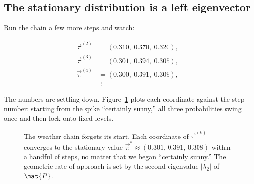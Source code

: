\subsection{The stationary distribution is a left eigenvector}

Run the chain a few more steps and watch:

\[
\begin{aligned}
\vec\pi^{(2)} &= (0.310,\ 0.370,\ 0.320),\\
\vec\pi^{(3)} &= (0.301,\ 0.394,\ 0.305),\\
\vec\pi^{(4)} &= (0.300,\ 0.391,\ 0.309),\\
&\ \,\vdots
\end{aligned}
\]

The numbers are settling down. Figure~\ref{ch35:fig-converge} plots each coordinate against
the step number: starting from the spike ``certainly sunny,'' all three probabilities swing
once and then lock onto fixed levels.

\begin{figure}[H]
\centering
{}
\caption{The weather chain forgets its start. Each coordinate of $\vec\pi^{(k)}$ converges to
the stationary value $\vec\pi^\ast \approx (0.301,\,0.391,\,0.308)$ within a handful of steps,
no matter that we began ``certainly sunny.'' The geometric rate of approach is set by the
second eigenvalue $|\lambda_2|$ of $\mat{P}$.}
\label{ch35:fig-converge}
\end{figure}

